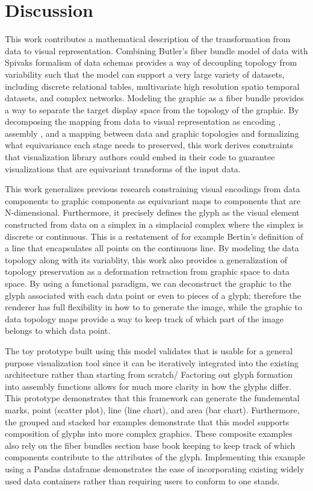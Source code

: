 \documentclass[../main.tex]{subfiles}
\begin{document}
\section{Discussion}

This work contributes a mathematical description of the transformation from data to visual representation. Combining Butler's fiber bundle model of data with Spivaks formalism of data schemas provides a way of decoupling topology from variability such that the model can support a very large variety of datasets, including discrete relational tables, multivariate high resolution spatio temporal datasets, and complex networks. Modeling the graphic as a fiber bundle provides a way to separate the target display space from the topology of the graphic. By decomposing the mapping from data to visual representation as encoding \vchannel, assembly \vmark, and a mapping between data and graphic topologies \vindex and formalizing what equivariance each stage needs to preserved, this work derives constraints that visualization library authors could embed in their code to guarantee visualizations that are equivariant transforms of the input data. 

This work generalizes previous research constraining visual encodings from data components to graphic components as equivariant maps to components that are N-dimensional. Furthermore, it precisely defines the glyph as the visual element constructed from data on a simplex in a simplacial complex where the simplex is discrete or continuous. This is a restatement of for example Bertin's definition of a line that encapsulates all points on the continuous line.  By modeling the data topology along with its variablity, this work also provides  a generalization of topology preservation as a deformation retraction from graphic space to data space. By using a functional paradigm, we can deconstruct the graphic to the glyph associated with each data point or even to pieces of a glyph; therefore the renderer has full  flexibility in how to to generate the image, while the graphic to data topology maps provide a way to keep track of which part of the image belongs to which data point. 

The toy prototype built using this model validates that is usable for a general purpose visualization tool since it can be iteratively integrated into the existing architecture rather than starting from scratch/ Factoring out glyph formation into assembly functions allows for much more clarity in how the glyphs differ. This prototype demonstrates that this framework can generate the fundemental marks, point (scatter plot), line (line chart), and area (bar chart). Furthermore, the grouped and stacked bar examples demonstrate that this model supports composition of glyphs into more complex graphics. These composite examples also rely on the fiber bundles section base book keeping to keep track of which components contribute to the attributes of the glyph. Implementing this example using a Pandas dataframe demonstrates the ease of incorporating existing widely used data containers rather than requiring users to conform to one stands.  
\end{document}
